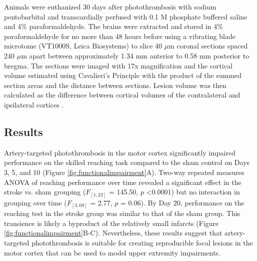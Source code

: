 Animals were euthanized 30 days after photothrombosis with sodium pentobarbital and transcardially perfused with 0.1 M phosphate buffered saline and 4\% paraformaldehyde. The brains were extracted and stored in 4\% paraformaldehyde for no more than 48 hours before using a vibrating blade microtome (VT1000S, Leica Biosystems) to slice 40 $\mu$m coronal sections spaced 240 $\mu$m apart between approximately 1.34 mm anterior to 0.58 mm posterior to bregma. The sections were imaged with 17x magnification and the cortical volume estimated using Cavalieri's Principle \cite{Rosen:1990bf} with the product of the summed section areas and the distance between sections. Lesion volume was then calculated as the difference between cortical volumes of the contralateral and ipsilateral cortices \cite{Tennant:2011cx}.

\subsection{Results}

Artery-targeted photothrombosis in the motor cortex significantly impaired performance on the skilled reaching task compared to the sham control on Days 3, 5, and 10 (Figure \ref{fig:functionalimpairment}A). Two-way repeated measures ANOVA of reaching performance over time revealed a significant effect in the stroke vs. sham grouping ($F_{[1,23]}$ = 145.50, $p$ \textless 0.0001) but no interaction in grouping over time ($F_{[3,69]}$ = 2.77, $p$ = 0.06). By Day 20, performance on the reaching test in the stroke group was similar to that of the sham group. This transience is likely a byproduct of the relatively small infarcts (Figure \ref{fig:functionalimpairment}B-C). Nevertheless, these results suggest that artery-targeted photothrombosis is suitable for creating reproducible focal lesions in the motor cortex that can be used to model upper extremity impairments.

